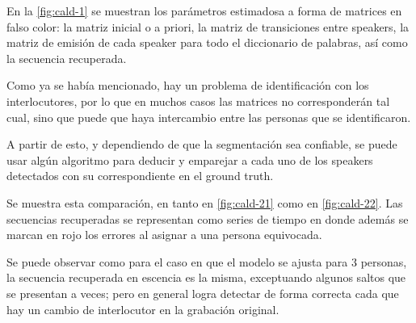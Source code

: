 En la \autoref{fig:cald-1} se muestran los parámetros estimadosa a forma de matrices en falso color: la matriz inicial o a priori, la matriz de transiciones entre speakers, la matriz de emisión de cada speaker para todo el diccionario de palabras, así como la secuencia recuperada.

Como ya se había mencionado, hay un problema de identificación con los interlocutores, por lo que en muchos casos las matrices no corresponderán tal cual, sino que puede que haya intercambio entre las personas que se identificaron.

A partir de esto, y dependiendo de que la segmentación sea confiable, se puede usar algún algoritmo para deducir y emparejar a cada uno de los speakers detectados con su correspondiente en el ground truth.

Se muestra esta comparación, en tanto en \autoref{fig:cald-21} como en \autoref{fig:cald-22}. Las secuencias recuperadas se representan como series de tiempo en donde además se marcan en rojo los errores al asignar a una persona equivocada.

Se puede observar como para el caso en que el modelo se ajusta para 3 personas, la secuencia recuperada en escencia es la misma, exceptuando algunos saltos que se presentan a veces; pero en general logra detectar de forma correcta cada que hay un cambio de interlocutor en la grabación original.

